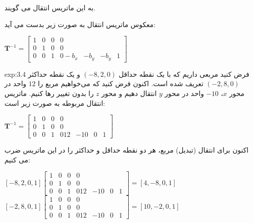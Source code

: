 {\begin{spacing}{1.5}
        به این ماتریس انتقال می گویند.

        معکوس ماتریس انتقال به صورت زیر بدست می آید:

        \begin{center}
            $\textbf{T}^{-1}=\begin{bmatrix}
                                 1 & 0 & 0 & 0 \\
                                 0 & 1 & 0 & 0 \\
                                 0 & 0 & 1 & 0
                                 -b_{x} & -b_{y} & -b_{y} & 1
            \end{bmatrix}$
        \end{center}

        \begin{example}{exp:3.4}
            \Large
            فرض کنید مربعی داریم که با یک نقطه حداقل $(-8, 2, 0)$ و یک نقطه حداکثر $(-2, 8, 0)$ تعریف شده است.
            اکنون فرض کنید که می‌خواهیم مربع را $12$ واحد در محور $x$، $-10$ واحد در محور $y$ انتقال دهیم
            و محور $z$ را بدون تغییر رها کنیم.
            ماتریس انتقال مربوطه به صورت زیر است:

            \begin{center}
                $\textbf{T}^{-1}=\begin{bmatrix}
                                     1 & 0 & 0 & 0 \\
                                     0 & 1 & 0 & 0 \\
                                     0 & 0 & 1 & 0
                                     12 & -10 & 0 & 1
                \end{bmatrix}$
            \end{center}

            اکنون برای انتقال (تبدیل) مربع، هر دو نقطه حداقل و حداکثر را در این ماتریس ضرب می کنیم:

            \begin{center}
                $[-8, 2, 0, 1]\begin{bmatrix}
                                  1 & 0 & 0 & 0 \\
                                  0 & 1 & 0 & 0 \\
                                  0 & 0 & 1 & 0
                                  12 & -10 & 0 & 1
                \end{bmatrix}=[4, -8, 0, 1]$ \\
                $[-2, 8, 0, 1]\begin{bmatrix}
                                  1 & 0 & 0 & 0 \\
                                  0 & 1 & 0 & 0 \\
                                  0 & 0 & 1 & 0
                                  12 & -10 & 0 & 1
                \end{bmatrix}=[10, -2, 0, 1]$
            \end{center}


\end{example}
\end{spacing}}
